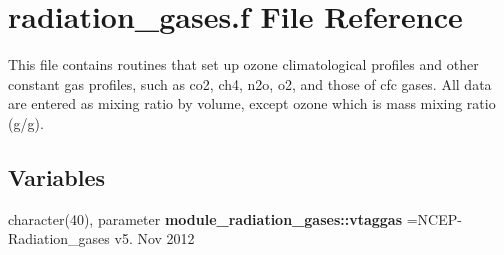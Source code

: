 \hypertarget{radiation__gases_8f}{}\section{radiation\+\_\+gases.\+f File Reference}
\label{radiation__gases_8f}


This file contains routines that set up ozone climatological profiles and other constant gas profiles, such as co2, ch4, n2o, o2, and those of cfc gases. All data are entered as mixing ratio by volume, except ozone which is mass mixing ratio (g/g).  


\subsection*{Variables}
\begin{DoxyCompactItemize}
\item 
\mbox{\label{radiation__gases_8f_a8a79a6d3d931da021cd19290c58bdfaa}} 
character(40), parameter {\bfseries module\+\_\+radiation\+\_\+gases\+::vtaggas} =\textquotesingle{}N\+C\+EP-\/Radiation\+\_\+gases v5. Nov 2012 \textquotesingle{}
\end{DoxyCompactItemize}
